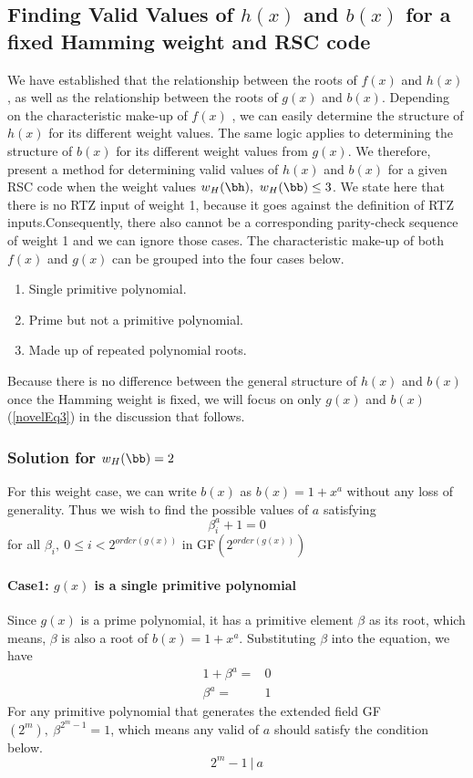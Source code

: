 \subsection{Finding Valid Values of $h(x)$ and $b(x)$ for a fixed Hamming weight and RSC code\newline}
We have established that the relationship between the roots of $f(x)$ and $h(x)$, as well as the relationship between the roots of $g(x)$ and $b(x)$. Depending on the characteristic make-up of $f(x)$ , we can easily determine the structure of $h(x)$ for its different weight values. The same logic applies to determining the structure of $b(x)$ for its different weight values from $g(x)$. 
We therefore, present a method for determining valid values of $h(x)$ and $b(x)$ for a given RSC code when the weight values $w_H(\bh),~w_H(\bb) \leq 3$. We state here that there is no RTZ input of weight 1, because it goes against the definition of RTZ inputs.Consequently, there also cannot be a corresponding parity-check sequence of weight 1 and we can ignore those cases. 
The characteristic make-up of both $f(x)$ and $g(x)$ can be grouped into the four cases below. 
\begin{enumerate}
\item Single primitive polynomial.
\item Prime but not a primitive polynomial.
\item Made up of repeated polynomial roots.
\end{enumerate}
Because there is no difference between the general structure of $h(x)$ and $b(x)$ once the Hamming weight is fixed, we will focus on only $g(x)$ and $b(x)$ (\ref{novelEq3}) in the discussion that follows.
\newpage
\subsubsection{Solution for $w_H(\bb) =2$}
For this weight case, we can write $b(x)$ as $b(x)=1+x^a$ without any loss of generality. Thus we wish to find the possible values of $a$ satisfying $$\beta_i^a+1=0$$
for all $\beta_i,~0 \leq i < 2^{order(g(x))}$ in GF$(2^{order(g(x))})$
\paragraph{ Case1: $g(x)$ is a single primitive polynomial}
Since $g(x)$ is a prime polynomial, it has a primitive element $\beta$ as its root, which means, $\beta$ is also a root of $b(x)=1+x^a$. Substituting $\beta$ into the equation, we have 
\begin{equation}
\begin{split}
1+\beta^a=&0\\
\beta^a=&1
\end{split}
\end{equation}
For any primitive polynomial that generates the extended field GF$(2^m),~\beta^{2^{m}-1}=1$, 
which means any valid of $a$ should satisfy the condition below.
$$2^{m}-1~|~a$$

